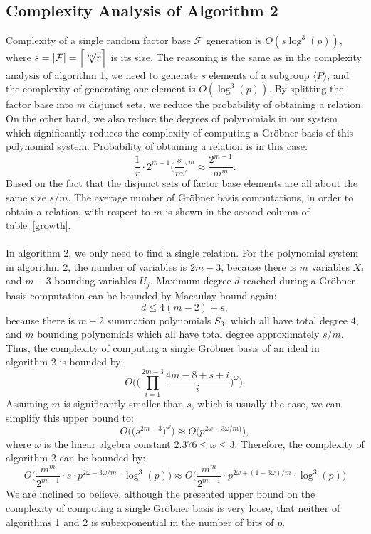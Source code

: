 \documentclass[thesis=M,english]{FITthesis}[2012/10/20]
\theoremstyle{remark}
\theoremstyle{definition}
\begin{document}
\subsection{Complexity Analysis of Algorithm 2}
Complexity of a single random factor base $\mathcal{F}$ generation is $O(s\log^3(p))$, where $s = |\mathcal{F}| = \mathlarger{\Big\lceil \sqrt[m]{r} \Big\rceil}$ is its size. The reasoning is the same as in the complexity analysis of algorithm 1, we need to generate $s$ elements of a subgroup $\langle P \rangle$, and the complexity of generating one element is $O(\log^3(p))$. By splitting the factor base into $m$ disjunct sets, we reduce the probability of obtaining a relation. On the other hand, we also reduce the degrees of polynomials in our system which significantly reduces the complexity of computing a Gröbner basis of this polynomial system. Probability of obtaining a relation is in this case:
$$
\frac{1}{r}\cdot2^{m-1} \bigg(\frac{s}{m}\bigg)^m \approx \frac{2^{m-1}}{m^m}.
$$
\noindent Based on the fact that the disjunct sets of factor base elements are all about the same size $s/m$. The average number of Gröbner basis computations, in order to obtain a relation, with respect to $m$ is shown in the second column of table~\ref{growth}. \\ \\
\noindent In algorithm 2, we only need to find a single relation.  For the polynomial system in algorithm 2, the number of variables is $2m-3$, because there is $m$ variables $X_i$ and $m-3$ bounding variables $U_j$. Maximum degree $d$ reached during a Gröbner basis computation can be bounded by Macaulay bound again:
$$
d \leq 4(m-2) + s,
$$
because there is $m - 2$ summation polynomials $S_3$, which all have total degree $4$, and $m$ bounding polynomials which all have total degree approximately $s/m$.  Thus, the complexity of computing a single Gröbner basis of an ideal in algorithm 2 is bounded by:
$$
O\Bigg(\bigg(\prod_{i=1}^{2m-3}\frac{4m - 8 + s + i}{i} \bigg)^\omega\Bigg).
$$
Assuming $m$ is significantly smaller than $s$, which is usually the case, we can simplify this upper bound to:
$$
O\Bigg(\bigg(s^{2m-3}\bigg)^\omega\Bigg) \approx O\Bigg( p^{2\omega - 3\omega/m)}\Bigg),
$$
where $\omega$ is the linear algebra constant $2.376 \leq \omega \leq 3.$
\noindent Therefore, the complexity of algorithm 2 can be bounded by:
$$
O\Bigg(\frac{m^m}{2^{m-1}}\cdot s \cdot p^{2\omega - 3\omega/m} \cdot \log^3(p)\Bigg) \approx O\Bigg(\frac{m^m}{2^{m-1}}\cdot p^{2\omega +(1- 3\omega)/m}\cdot \log^3(p)\Bigg)
$$
We are inclined to believe, although the presented upper bound on the complexity of computing a single Gröbner basis is very loose, that neither of algorithms 1 and 2 is subexponential in the number of bits of $p$.
\end{document}
